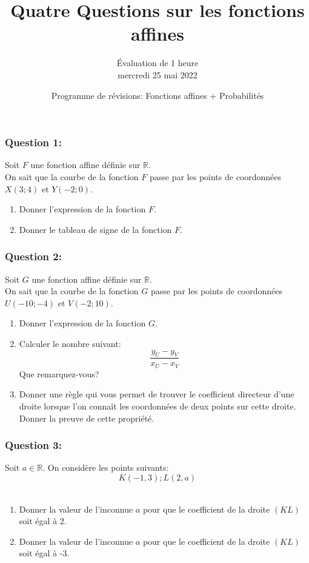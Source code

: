 \documentclass[t,12pt]{beamer}
\title{ Quatre Questions sur les fonctions affines}
\author{Évaluation de 1 heure \\mercredi 25 mai 2022}
\date{Programme de révisions: Fonctions affines + Probabilités}
\newcommand{\R}{\mathbb{R}}
\begin{document}
	\maketitle	
\begin{frame}
	
	\frametitle{Question 1: }
Soit $F$ une fonction affine définie sur $\R$.\hfill\\[0.2cm]

On sait que la courbe de la fonction $F$ passe par les points de coordonnées $X(3;4)$ et $Y(-2;0)$. 
\begin{enumerate}
	\item Donner l'expression de la fonction $F$.
	\item Donner le tableau de signe de la fonction $F$. 
\end{enumerate}
		

	

\end{frame}

\begin{frame}
	\frametitle{Question 2: }
	
Soit $G$ une fonction affine définie sur $\R$.\hfill\\[0.2cm]

On sait que la courbe de la fonction $G$ passe par les points de coordonnées $U(-10;-4)$ et $V(-2;10)$. 
\begin{enumerate}
	\item Donner l'expression de la fonction $G$.
	\item Calculer le nombre suivant:
	$$\dfrac{y_U-y_V}{x_U-x_V}$$ 
	Que remarquez-vous?
	\item Donner une règle qui vous permet de trouver le coefficient directeur d'une droite lorsque l'on connaît les coordonnées de deux points sur cette droite. Donner la preuve de cette propriété. 
	
\end{enumerate}


\end{frame}

\begin{frame}
	\frametitle{Question 3: }
	
	Soit $a\in\R$. On considère les points suivants:
	$$K\left(-1,3\right) ; L\left(2,a\right)$$  \hfill\\[0.2cm]
	 
	\begin{enumerate}  
		\item Donner la valeur de l'inconnue $a$ pour que le coefficient de la droite $\left(KL\right)$ soit égal à 2. 
		\item Donner la valeur de l'inconnue $a$ pour que le coefficient de la droite $\left(KL\right)$ soit égal à -3.
		
	\end{enumerate}
	
	
\end{frame}
\end{document}
